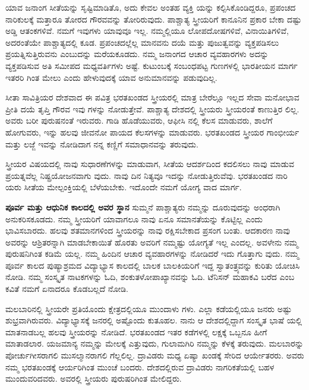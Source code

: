 ಯಾವ ಜನಾಂಗ ಸೀತೆಯನ್ನು ಸೃಷ್ಟಿಮಾಡಿತೊ, ಅದು ಕೇವಲ ಅಂತಹ ವ್ಯಕ್ತಿ ಯನ್ನು ಕಲ್ಪಿಸಿಕೊಂಡಿದ್ದರೂ, ಪ್ರಪಂಚದ ನಾರಿಕುಲಕ್ಕೆ ಮತ್ತಾರೂ ತೋರದ ಗೌರವವನ್ನು ತೋರಿರುವುದು. ಪಾಶ್ಚಾತ್ಯ ಸ್ತ್ರೀಯರಿಗೆ ಕಾನೂನಿನ ಪ್ರಕಾರ ಬೇಕಾ ದಷ್ಟು ಅಡ್ಡಿ ಆತಂಕಗಳಿವೆ. ನಮಗೆ ಇವುಗಳು ಯಾವುವೂ ಇಲ್ಲ. ನಮ್ಮಲ್ಲಿಯೂ ಲೋಪದೋಷಗಳಿವೆ, ವಿನಾಯಿತಿಗಳಿವೆ, ಅದರಂತೆಯೇ ಪಾಶ್ಚಾತ್ಯದಲ್ಲಿ ಕೂಡ. ಪ್ರಪಂಚದಲ್ಲೆಲ್ಲ ಮಾನವನು ದಯೆ ಮತ್ತು ಪುಜುತ್ವವನ್ನು ವ್ಯಕ್ತಪಡಿಸಲು ಪ್ರಯತ್ನಿಸುತ್ತಿರುವನು ಎಂಬುದನ್ನು ಮರೆಯಕೂಡದು. ನಮ್ಮ ಜನಾಂಗದ ಆಚಾರ ವ್ಯವಹಾರಗಳು ಅದನ್ನು ವ್ಯಕ್ತಪಡಿಸುವ ಅತಿ ಸಮೀಪದ ಮಧ್ಯವರ್ತಿಗಳು ಅಷ್ಟೆ. ಕುಟುಂಬಕ್ಕೆ ಸಂಬಂಧಪಟ್ಟ ಗುಣಗಳಲ್ಲಿ ಭಾರತೀಯನ ಮಾರ್ಗ ಇತರರಿ ಗಿಂತ ಮೇಲು ಎಂದು ಹೇಳುವುದಕ್ಕೆ ಯಾವ ಅನುಮಾನವನ್ನು ಪಡುವುದಿಲ್ಲ.

ಸೀತಾ ಸಾವಿತ್ರಿಯರ ದೇಶವಾದ ಈ ಪವಿತ್ರ ಭರತಖಂಡದ ಸ್ತ್ರೀಯರಲ್ಲಿ ಮಾತ್ರ ಬೇರೆಲ್ಲೂ ಇಲ್ಲದ ಸೇವಾ ಮನೋಭಾವ ಪ್ರೀತಿ ದಯೆ ತೃಪ್ತಿ ಗೌರವ ಇವು ಗಳನ್ನು ನೋಡುತ್ತೇವೆ. ಪಾಶ್ಚಾತ್ಯ ದೇಶದಲ್ಲಿ ಸ್ತ್ರೀಯರು ಸ್ತ್ರೀಯರಂತೆ ಕಾಣುತ್ತಿರ ಲಿಲ್ಲ. ಅವರು ಬರೀ ಪುರುಷನಂತೆ ಇರುವರು. ಗಾಡಿ ಹೊಡೆಯುವರು, ಆಫೀಸಿ ನಲ್ಲಿ ಕೆಲಸ ಮಾಡುವರು, ಶಾಲೆಗೆ ಹೋಗುವರು, ಇನ್ನು ಹಲವು ಜೀವನೋ ಪಾಯದ ಕೆಲಸಗಳನ್ನು ಮಾಡುವರು. ಭರತಖಂಡದ ಸ್ತ್ರೀಯರ ಗಾಂಭೀರ್ಯ ಮತ್ತು ಲಜ್ಜೆ ಇವನ್ನು ನೋಡಿದಾಗ ನನ್ನ ಕಣ್ಣಿಗೆ ಸಮಾಧಾನವನ್ನು ತರುವುದು.

ಸ್ತ್ರೀಯರ ವಿಷಯದಲ್ಲಿ ನಾವು ಸುಧಾರಣೆಗಳನ್ನು ಮಾಡುವಾಗ, ಸೀತೆಯ ಆದರ್ಶದಿಂದ ಕದಲಿಸಲು ನಾವು ಮಾಡುವ ಪ್ರಯತ್ನವೆಲ್ಲ ನಿಷ್ಪ್ರಯೋಜನವಾಗು ವುದು. ನಾವು ದಿನ ನಿತ್ಯವೂ ಇದನ್ನು ನೋಡುತ್ತಿರುವೆವು. ಭರತಖಂಡದ ನಾರಿ ಯರು ಸೀತೆಯ ಮೇಲ್ಪಂಕ್ತಿಯಲ್ಲಿ ಬೆಳೆಯಬೇಕು. ಇದೊಂದೇ ನಮಗೆ ಯೋಗ್ಯ ವಾದ ಮಾರ್ಗ.

\textbf{ಪೂರ್ವ ಮತ್ತು ಆಧುನಿಕ ಕಾಲದಲ್ಲಿ ಅವರ ಸ್ಥಾನ} ಸುಮ್ಮನೆ ಪಾಶ್ಚಾತ್ಯರು ನಮ್ಮನ್ನು ದೂರುವುದನ್ನು ಅಂಧರಾಗಿ ಅನುಕರಿಸಕೂಡದು. ನಮ್ಮ ಸ್ತ್ರೀಯರಿಗೆ ಯಾವಾಗಲೂ ನಾವು ಏನೂ ಸಮಾನತೆಯನ್ನು ಕೊಟ್ಟಿಲ್ಲ ಎಂದು ಭಾವಿಸಬಾರದು. ಹಲವು ಶತಮಾನಗಳಿಂದ ಸ್ತ್ರೀಯರನ್ನು ನಾವು ರಕ್ಷಿಸಬೇಕಾದ ಪ್ರಸಂಗ ಬಂತು. ಆದಕಾರಣ ನಾವು ಅವರನ್ನು ಆಶ್ರಿತರನ್ನಾಗಿ ಮಾಡಬೇಕಾಯಿತೆ ಹೊರತು ಅವರಿಗೆ ನಮ್ಮಷ್ಟು ಯೋಗ್ಯತೆ ಇಲ್ಲ ಎಂದಲ್ಲ. ಅವಳೇನು ನಮ್ಮ ಪುರುಷನಿಗಿಂತ ಕಡಿಮೆ ಯಲ್ಲ. ನಮ್ಮ ಹಿಂದಿನ ಆಚಾರ ವ್ಯವಹಾರಗಳನ್ನು ನೋಡಿದರೆ ಇದು ಗೊತ್ತಾಗು ವುದು. ನಮ್ಮ ಪೂರ್ವ ಕಾಲದ ಪುಷ್ಯಾಶ್ರಮದ ವಿದ್ಯಾಭ್ಯಾಸ ಕಾಲದಲ್ಲಿ ಬಾಲಕ ಬಾಲಕಿಯರಿಗೆ ಇದ್ದ ಸ್ವಾತಂತ್ರ್ಯವನ್ನು ಕುರಿತು ಯೋಚಿಸಿ ನೋಡಿ. ನಮ್ಮ ಸಂಸ್ಕೃತ ನಾಟಕಗಳನ್ನು ಓದಿ, ಶಂಕುತಳೋಪಾಖ್ಯಾನವನ್ನು ಓದಿ. ಟೆನಿಸನ್ ಮಹಾಕವಿ ಬರೆದ  ಎಂಬ ಕವಿತೆ ನಮಗೆ ಏನಾದರೂ ಕೊಡಬಲ್ಲದೆ ನೋಡಿ.

ಮಲಬಾರಿನಲ್ಲಿ ಸ್ತ್ರೀಯರೇ ಪ್ರತಿಯೊಂದು ಕ್ಷೇತ್ರದಲ್ಲಿಯೂ ಮುಂದಾಳು ಗಳು. ಎಲ್ಲಾ ಕಡೆಯಲ್ಲಿಯೂ ಜನರು ಅಷ್ಟು ಶುಭ್ರವಾಗಿರುವರು. ವಿದ್ಯಾಭ್ಯಾಸಕ್ಕೆ ಜನರಲ್ಲಿ ಅಷ್ಟೊಂದು ಕುತೂಹಲ. ನಾನು ಆ ದೇಶದಲ್ಲಿದ್ದಾಗ ಸಂಸ್ಕೃತ ಭಾಷೆ ಯಲ್ಲಿ ಮಾತನಾಡಬಲ್ಲ ಹಲವು ಸ್ತ್ರೀಯರನ್ನು ನೋಡಿದೆ. ಭರತಖಂಡದ ಇತರ ಕಡೆಗಳಲ್ಲಿ ಲಕ್ಷಕ್ಕೆ ಒಬ್ಬನೂ ಹೀಗೆ ಮಾತಾಡಲಾರ. ಯಜಮಾನ್ಯ ನಮ್ಮನ್ನು ಮೇಲಕ್ಕೆ ಎತ್ತುವುದು, ಗುಲಾಮಗಿರಿ ನಮ್ಮನ್ನು ಕೆಳಕ್ಕೆ ತರುವುದು. ಮಲಬಾರನ್ನು ಪೋರ್ಚುಗೀಸರಾಗಲಿ ಮುಸಲ್ಮಾನರಾಗಲಿ ಗೆಲ್ಲಲಿಲ್ಲ. ದ್ರಾವಿಡರು ಮಧ್ಯ ಏಷ್ಯಾ ಖಂಡಕ್ಕೆ ಸೇರಿದ ಆರ್ಯೇತರರು. ಅವರು ನಮ್ಮ ಭರತಖಂಡಕ್ಕೆ ಆರ್ಯರಿಗಿಂತ ಮುಂಚೆ ಬಂದರು. ದೇಶದಲ್ಲಿರುವ ದ್ರಾವಿಡರು ನಾಗರಿಕತೆಯಲ್ಲಿ ಬಹಳ ಮುಂದುವರಿದವರು. ಅವರಲ್ಲಿ ಸ್ತ್ರೀಯರು ಪುರುಷರಿಗಿಂತ ಮೇಲಿದ್ದರು.

